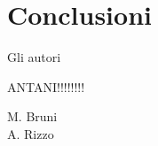 \section{Conclusioni}

\singlespacing
\begin{flushright}
Gli autori
\vspace{0.5cm}


ANTANI!!!!!!!!



M. Bruni \\
A. Rizzo
\end{flushright}

\doublespacing